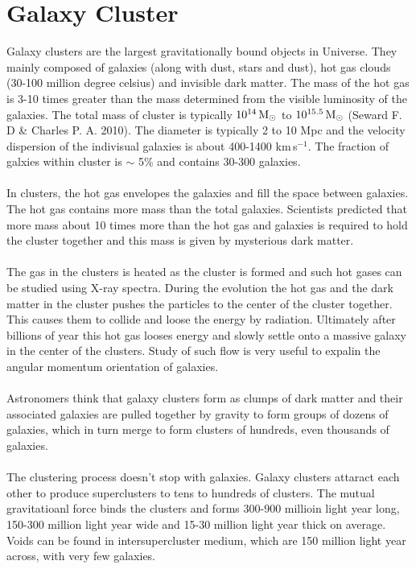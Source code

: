 %
\section{Galaxy Cluster}
Galaxy clusters are the largest gravitationally bound objects in Universe. They mainly composed of galaxies (along with dust, stars and dust), hot gas clouds (30-100 million degree celsius) and invisible dark matter. The mass of the hot gas is 3-10 times greater than the mass determined from the visible luminosity of the galaxies. The total mass of cluster is typically $10^{14}\text{\,M}_{\odot}$ to  $10^{15.5}\text{\,M}_{\odot}$ (Seward F. D \& Charles P. A. 2010). The diameter is typically 2 to 10 Mpc and the velocity dispersion of the indivisual galaxies is about 400-1400 km\,s$^{-1}$. The fraction of galxies within cluster is $\sim$ 5$\%$ and contains 30-300 galaxies.\\\\
In clusters, the hot gas envelopes the galaxies and fill the space between galaxies. The hot gas contains more mass than the total galaxies. Scientists predicted that more mass about 10 times more than the hot gas and galaxies is required to hold the cluster together and this mass is given by mysterious dark matter.\\\\%
The gas in the clusters is heated as the cluster is formed and such hot gases can be studied using X-ray spectra. During the evolution the hot gas and the dark matter in the cluster pushes the particles to the center of the cluster together. This causes them to collide and loose the energy by radiation. Ultimately after billions of year this hot gas looses energy and slowly settle onto a massive galaxy in the center of the clusters. Study of such flow is very useful to expalin the angular momentum orientation of galaxies.\\\\
Astronomers think that galaxy clusters form as clumps of dark matter and their associated galaxies are pulled together by gravity to form groups of dozens of galaxies, which in turn merge to form clusters of hundreds, even thousands of galaxies.\\\\%
The clustering process doesn't stop with galaxies. Galaxy clusters attaract each other to produce superclusters to tens to hundreds of clusters. The mutual gravitatioanl force binds the clusters and forms 300-900 millioin light year long, 150-300 million light year wide and 15-30 million light year thick on average. Voids can be found in intersupercluster medium, which are 150 million light year across, with very few galaxies.\\\\
